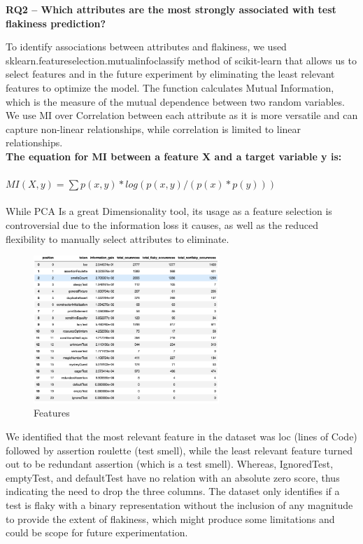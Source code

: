 \documentclass[sigconf,review]{acmart}
\begin{document}
\textbf{ RQ2 – Which attributes are the most strongly associated with test flakiness prediction?}

To identify associations between attributes and flakiness, we used sklearn.feature\textunderscore selection.mutual\textunderscore info\textunderscore classify method of scikit-learn that allows us to select features and in the future experiment by eliminating the least relevant features to optimize the model. The function calculates Mutual Information, which is the measure of the mutual dependence between two random variables. We use MI over Correlation between each attribute as it is more versatile and can capture non-linear relationships, while correlation is limited to linear relationships. 
\\
\textbf{The equation for MI between a feature X and a target variable y is:}\\
\\\begin{math}MI(X, y) = \sum p(x,y) * log(p(x,y) / (p(x) * p(y)))\end{math}
\\
\\
While PCA Is a great Dimensionality tool, its usage as a feature selection is controversial due to the information loss it causes, as well as the reduced flexibility to manually select attributes to eliminate.
\begin{figure}
    \centering
    \includegraphics[width=7cm]{Tokens.png}
    \caption{Features}
    \label{fig:my_label}
\end{figure}
We identified that the most relevant feature in the dataset was loc (lines of Code) followed by assertion roulette (test smell), while the least relevant feature turned out to be redundant assertion (which is a test smell). Whereas, IgnoredTest, emptyTest, and defaultTest have no relation with an absolute zero score, thus indicating the need to drop the three columns.
The dataset only identifies if a test is flaky with a binary representation without the inclusion of any magnitude to provide the extent of flakiness, which might produce some limitations and could be scope for future experimentation.
\end{document}
